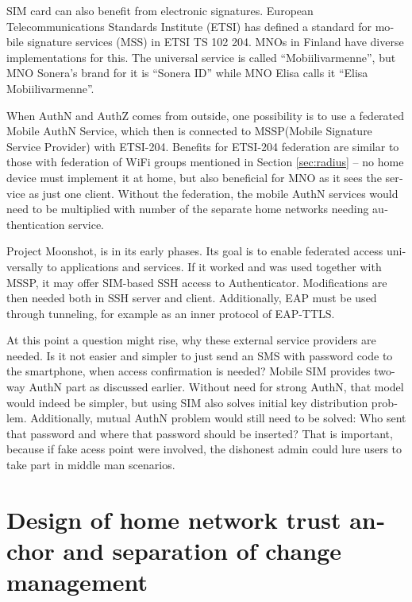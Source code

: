 \documentclass[12pt,a4paper,english]{tutthesis}
\begin{document}
\begin{otherlanguage}{english}
SIM card can also benefit from electronic signatures.
European Telecommunications Standards Institute (ETSI) has defined a
standard for mobile signature services (MSS) in ETSI TS 102 204.
MNOs in Finland have diverse implementations for this. The universal 
service is called ``Mobiilivarmenne'', but MNO Sonera's brand for it
is ``Sonera ID'' while MNO Elisa calls it ``Elisa Mobiilivarmenne''.

When AuthN and AuthZ comes from outside, one possibility is to use a
federated Mobile AuthN Service, which then is connected to  MSSP(Mobile
Signature Service Provider) with ETSI-204. Benefits for ETSI-204
federation are similar to those with federation of WiFi groups
mentioned in Section \ref{sec:radius} -- no home device must implement it at home,
but also beneficial for  MNO as it sees the service as just one
client.  Without the federation, the mobile AuthN services would need to be
multiplied with number of the separate home networks  needing authentication service.



Project Moonshot\cite{moonshot}, is in its early phases. Its goal is
to enable federated access universally to applications and
services. If it worked and was used together with MSSP, it may offer
SIM-based SSH access to Authenticator. Modifications are then needed 
both in SSH server and client. Additionally, EAP must be used through
tunneling, for example as an inner protocol of EAP-TTLS.

At this point a question might rise, why these external service
providers are needed. Is it not easier and simpler to just send 
an SMS with password code to the smartphone, when access confirmation is needed?
Mobile SIM provides two-way AuthN part as discussed earlier.
Without need for strong AuthN, that model would indeed be 
simpler, but using SIM also solves initial key distribution problem.
Additionally, mutual AuthN problem would still need to be solved:
Who sent that password and where that password should be inserted?
That is important, because if fake acess point were involved, the 
dishonest admin could lure users to take part in middle man scenarios.





\chapter{Design of home network trust anchor and separation of change management}
\label{sec-4}






\end{otherlanguage}
\end{document}
